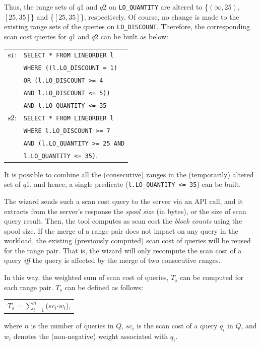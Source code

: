 \documentclass[paper]{ieice}
\def\range#1{$[{#1}]$}
\def\openrange#1{$({#1})$}
\def\Sone{\mbox{\sl s1}}
\def\Stwo{\mbox{\sl s2}}
\begin{document}
Thus, the range sets of $q$1 and $q$2 on {\tt LO\_QUANTITY} are 
altered to \{\openrange{\infty, 25}, \range{25, 35}\} and \{\range{25, 35}\}, 
respectively. Of course, no change is made to the existing range sets 
of the queries on {\tt LO\_DISCOUNT}. 
Therefore, the corresponding scan cost queries for $q$1 and $q$2 
can be built as below:
\begin{center}
\begin{tabular}{rl}
$\Sone$:	& {\tt SELECT * FROM LINEORDER l} \\
		& {\tt WHERE ((l.LO\_DISCOUNT = 1)} \\
		& {\tt OR (l.LO\_DISCOUNT >= 4} \\ 
		& {\tt AND l.LO\_DISCOUNT <= 5))} \\
		& {\tt AND l.LO\_QUANTITY <= 35}  \\ 
$\Stwo$:	& {\tt SELECT * FROM LINEORDER l} \\
        & {\tt WHERE l.LO\_DISCOUNT >= 7} \\
        & {\tt AND (l.LO\_QUANTITY >= 25 AND} \\ 
        & {\tt l.LO\_QUANTITY <= 35)}.
\end{tabular}
\end{center}

It is possible to combine all the (consecutive) ranges in the (temporarily) altered set of $q$1, 
and hence, a single predicate ({\tt l.LO\_QUANTITY <= 35}) can be built. 

The wizard sends such a scan cost query to the server via an API call, 
and it extracts from the server's response the {\em spool size} (in bytes), or the size of scan query result. 
Then, the tool computes as scan cost the {\em block counts} using the spool size. 
If the merge of a range pair does not impact on any query in the workload, 
the existing (previously computed) scan cost of queries 
will be reused for the range pair. 
That is, the wizard will only recompute 
the scan cost of a query {\em iff} the query is affected by 
the merge of two consecutive ranges. 

In this way, the weighted sum of scan cost of queries, $T_{s}$ can be computed 
for each range pair. 
$T_{s}$ can be defined as follows:
\begin{center}
\begin{tabular}{c} 
$T_{s}$ = $\sum_{i=1}^{n}$($sc_{i}${$\cdot$}{$w_{i}$}),
\end{tabular}
\end{center}
where $n$ is the number of queries in $Q$, $sc_{i}$ is the scan cost of a query $q_{i}$ in $Q$, and 
$w_{i}$ denotes the (\hbox{non-negative}) weight associated with $q_{i}$. 
\end{document}
